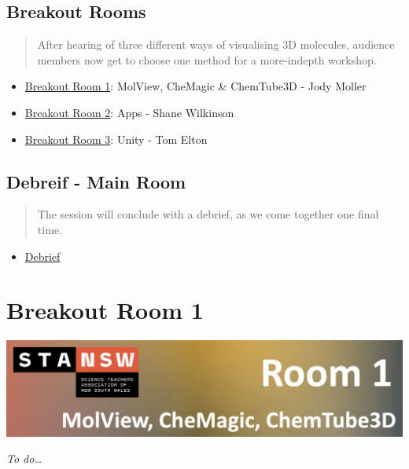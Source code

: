 \documentclass[
]{book}
\providecommand{\tightlist}{%
  \setlength{\itemsep}{0pt}\setlength{\parskip}{0pt}}
\begin{document}
\hypertarget{breakout-rooms}{%
\section*{Breakout Rooms}\label{breakout-rooms}}

\begin{quote}
After hearing of three different ways of visualising 3D molecules, audience members now get to choose one method for a more-indepth workshop.
\end{quote}

\begin{itemize}
\tightlist
\item
  \protect\hyperlink{Room-1}{Breakout Room 1}: MolView, CheMagic \& ChemTube3D - Jody Moller
\item
  \protect\hyperlink{Room-2}{Breakout Room 2}: Apps - Shane Wilkinson
\item
  \protect\hyperlink{Room-3}{Breakout Room 3}: Unity - Tom Elton
\end{itemize}

\hypertarget{debreif---main-room}{%
\section*{Debreif - Main Room}\label{debreif---main-room}}

\begin{quote}
The session will conclude with a debrief, as we come together one final time.
\end{quote}

\begin{itemize}
\tightlist
\item
  \protect\hyperlink{Debrief}{Debrief}
\end{itemize}

\hypertarget{Room-1}{%
\chapter{Breakout Room 1}\label{Room-1}}

\includegraphics[width=30.58in]{images/Room_1}

\emph{To do\ldots{}}
\end{document}
